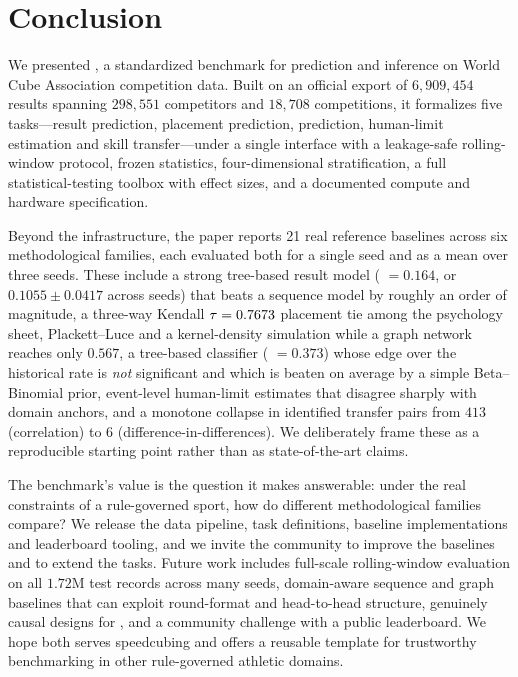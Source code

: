 \section{Conclusion}
\label{sec:conclusion}

We presented \wcabench, a standardized benchmark for prediction and inference
on World Cube Association competition data. Built on an official export of
$6{,}909{,}454$ results spanning $298{,}551$ competitors and $18{,}708$
competitions, it formalizes five tasks---result prediction, placement
prediction, \DNF{} prediction, human-limit estimation and skill
transfer---under a single interface with a leakage-safe rolling-window
protocol, frozen statistics, four-dimensional stratification, a full
statistical-testing toolbox with effect sizes, and a documented compute and
hardware specification.

Beyond the infrastructure, the paper reports 21 real reference baselines across
six methodological families, each evaluated both for a single seed and as a
mean over three seeds. These include a strong tree-based result model
(\maelog{} $=0.164$, or $0.1055\pm0.0417$ across seeds) that beats a sequence
model by roughly an order of magnitude, a three-way Kendall $\tau=0.7673$
placement tie among the psychology sheet, Plackett--Luce and a kernel-density
simulation while a graph network reaches only $0.567$, a tree-based \DNF{}
classifier (\aucpr{} $=0.373$) whose edge over the historical rate is \emph{not}
significant and which is beaten on average by a simple Beta--Binomial prior,
event-level human-limit estimates that disagree sharply with domain anchors,
and a monotone collapse in identified transfer pairs from $413$ (correlation)
to $6$ (difference-in-differences). We deliberately frame these as a
reproducible starting point rather than as state-of-the-art claims.

The benchmark's value is the question it makes answerable: under the real
constraints of a rule-governed sport, how do different methodological families
compare? We release the data pipeline, task definitions, baseline
implementations and leaderboard tooling, and we invite the community to improve
the baselines and to extend the tasks. Future work includes full-scale
rolling-window evaluation on all $1.72$M test records across many seeds,
domain-aware sequence and graph baselines that can exploit round-format and
head-to-head structure, genuinely causal designs for , and a community
challenge with a public leaderboard. We hope \wcabench{} both serves
speedcubing and offers a reusable template for trustworthy benchmarking in
other rule-governed athletic domains.
